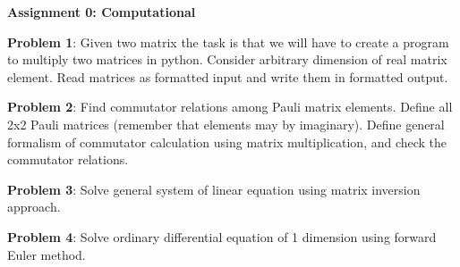 \documentclass[11pt]{article}
\begin{document}
	
	\begin{center}
		\textbf{Assignment 0: Computational} \\
	\end{center}
	
	
	\begin{flushleft}
		\textbf{Problem 1}: Given two matrix the task is that we will have to create a program to multiply two matrices in python. Consider arbitrary dimension of real matrix element. Read matrices as formatted input and write them in formatted output. 
	\end{flushleft}
	
	
	\begin{flushleft}
		\textbf{Problem 2}: Find commutator relations among Pauli matrix elements. Define all 2x2 Pauli matrices (remember that elements may by imaginary).  Define general formalism of commutator calculation using matrix multiplication, and check the commutator relations. 
	\end{flushleft}
	
	\begin{flushleft}
		\textbf{Problem 3}: Solve general system of linear equation using matrix inversion approach. 
	\end{flushleft}

	
	
	\begin{flushleft}
	\textbf{Problem 4}: Solve ordinary differential equation of 1 dimension using forward Euler method. 
	\end{flushleft}
	
	
	
\end{document}
